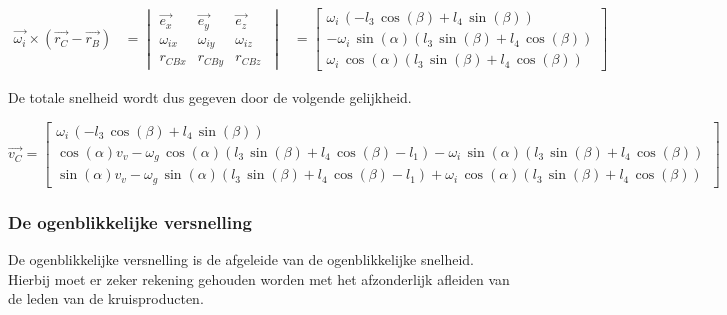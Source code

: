 \begin{equation*}
\begin{split}
\overrightarrow{\omega_{i}}\times(\overrightarrow{r_{C}}-\overrightarrow{r_{B}})
&=	\begin{vmatrix}
	\overrightarrow{e_{x}} & \overrightarrow{e_{y}} & \overrightarrow{e_{z}}\\
	\omega_{ix} & \omega_{iy} & \omega_{iz}\\
	r_{CBx} & r_{CBy} & r_{CBz}\
	\end{vmatrix}
&=	\begin{bmatrix}
\omega_{i}\, \left( -l_{3}\,\cos \left( \beta \right) +l_{4}\,\sin \left( \beta\right)  \right) \\
-\omega_{i}\,\sin \left( \alpha \right)  \left( l_{3}\,\sin \left( \beta \right) +l_{4}\,\cos \left( \beta \right) \right) \\
\omega_{i}\,\cos \left( \alpha \right) \left( l_{3}\,\sin \left( \beta \right) +l_{4}\,\cos \left( \beta\right)  \right) \
\end{bmatrix}
\end{split}
\end{equation*}

De totale snelheid wordt dus gegeven door de volgende gelijkheid.

\begin{equation*}
\overrightarrow{v_{C}}=
\begin{bmatrix}
\omega_{i}\, \left( -l_{3}\,\cos \left( \beta \right) +l_{4}\,\sin \left( \beta\right)  \right) \\

\cos \left( \alpha \right) v_{v}-\omega_{g}\,\cos\left( \alpha \right)  \left( l_{3}\,\sin \left( \beta \right) +l_{4}\,\cos \left( \beta \right) -l_{1} \right) -\omega_{i}\,\sin \left( \alpha \right)  \left( l_{3}\,\sin \left( \beta \right) +l_{4}\,\cos\left( \beta \right)  \right) \\

\sin \left( \alpha\right) v_{v}-\omega_{g}\,\sin \left( \alpha \right)  \left( l_{3}\,\sin \left( \beta \right) +l_{4}\,\cos \left( \beta \right) -l_{1}\right) +\omega_{i}\,\cos \left( \alpha \right)  \left( l_{3}\,\sin\left( \beta \right) +l_{4}\,\cos \left( \beta \right)  \right)\
\end{bmatrix}
\end{equation*}

\subsubsection{De ogenblikkelijke versnelling}
De ogenblikkelijke versnelling is de afgeleide van de ogenblikkelijke snelheid. Hierbij moet er zeker rekening gehouden worden met het afzonderlijk afleiden van de leden van de kruisproducten.

